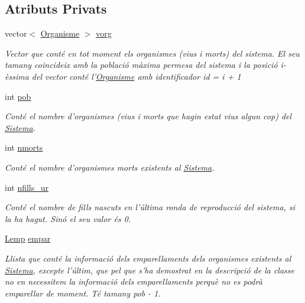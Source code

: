 \subsection*{Atributs Privats}
\begin{DoxyCompactItemize}
\item 
vector$<$ \hyperlink{class_organisme}{Organisme} $>$ \hyperlink{class_sistema_aaf10c33a8449e355103fb2d849bb3d58}{vorg}
\begin{DoxyCompactList}\small\item\em Vector que conté en tot moment els organismes (vius i morts) del sistema. El seu tamany coincideix amb la població màxima permesa del sistema i la posició {\itshape i-\/èssima} del vector conté l'\hyperlink{class_organisme}{Organisme} amb identificador {\itshape id = i + 1} \end{DoxyCompactList}\item 
int \hyperlink{class_sistema_a5fe670604926861f960dfb33c80d45cf}{pob}
\begin{DoxyCompactList}\small\item\em Conté el nombre d'organismes (vius i morts que hagin estat vius algun cop) del \hyperlink{class_sistema}{Sistema}. \end{DoxyCompactList}\item 
int \hyperlink{class_sistema_a3ece5701abfce5aafee7c06a11e90573}{nmorts}
\begin{DoxyCompactList}\small\item\em Conté el nombre d'organismes morts existents al \hyperlink{class_sistema}{Sistema}. \end{DoxyCompactList}\item 
int \hyperlink{class_sistema_aebdda1654fd616f76f03691926ecfb09}{nfills\-\_\-ur}
\begin{DoxyCompactList}\small\item\em Conté el nombre de fills nascuts en l'última ronda de reproducció del sistema, si la ha hagut. Sinó el seu valor és 0. \end{DoxyCompactList}\item 
\hyperlink{class_sistema_ad3aa7da7cab0f54bf8c67b62b7b1e8ef}{Lemp} \hyperlink{class_sistema_a98845ff9b4955ce24f2378d90ca135aa}{empar}
\begin{DoxyCompactList}\small\item\em Llista que conté la informació dels emparellaments dels organismes existents al \hyperlink{class_sistema}{Sistema}, excepte l'últim, que pel que s'ha demostrat en la descripció de la classe no en necessitem la informació dels emparellaments perquè no es podrà emparellar de moment. Té tamany {\itshape pob -\/ 1}.\par

\end{DoxyCompactList}
\end{DoxyCompactItemize}
